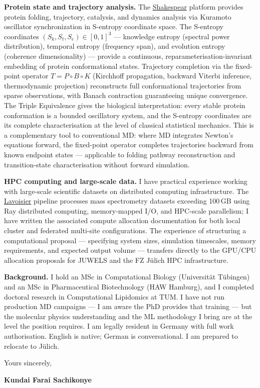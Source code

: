 \documentclass[12pt,a4paper]{article}
\begin{document}
\textbf{Protein state and trajectory analysis.}
The \href{https://shakespear-nine.vercel.app/instrument}{Shakespear} platform
provides protein folding, trajectory, catalysis, and dynamics analysis via
Kuramoto oscillator synchronization in S-entropy coordinate space.
The S-entropy coordinates $(S_k, S_t, S_e) \in [0,1]^3$ --- knowledge entropy
(spectral power distribution), temporal entropy (frequency span), and evolution
entropy (coherence dimensionality) --- provide a continuous, reparameterisation-invariant
embedding of protein conformational states.
Trajectory completion via the fixed-point operator $T = P \circ B \circ K$
(Kirchhoff propagation, backward Viterbi inference, thermodynamic projection)
reconstructs full conformational trajectories from sparse observations, with Banach
contraction guaranteeing unique convergence.
The Triple Equivalence gives the biological interpretation: every stable protein
conformation is a bounded oscillatory system, and the S-entropy coordinates are
its complete characterisation at the level of classical statistical mechanics.
This is a complementary tool to conventional MD: where MD integrates Newton's
equations forward, the fixed-point operator completes trajectories backward from
known endpoint states --- applicable to folding pathway reconstruction and
transition-state characterisation without forward simulation.

\textbf{HPC computing and large-scale data.}
I have practical experience working with large-scale scientific datasets on
distributed computing infrastructure. The \href{https://github.com/fullscreen-triangle/lavoisier}{Lavoisier}
pipeline processes mass spectrometry datasets exceeding 100\,GB using Ray
distributed computing, memory-mapped I/O, and HPC-scale parallelism; I have
written the associated compute allocation documentation for both local cluster
and federated multi-site configurations. The experience of structuring a
computational proposal --- specifying system sizes, simulation timescales, memory
requirements, and expected output volume --- transfers directly to the GPU/CPU
allocation proposals for JUWELS and the FZ Jülich HPC infrastructure.

\textbf{Background.}
I hold an MSc in Computational Biology (Universität Tübingen) and an MSc in
Pharmaceutical Biotechnology (HAW Hamburg), and I completed doctoral research
in Computational Lipidomics at TUM. I have not run production MD campaigns ---
I am aware the PhD provides that training --- but the molecular physics understanding
and the ML methodology I bring are at the level the position requires.
I am legally resident in Germany with full work authorisation.
English is native; German is conversational.
I am prepared to relocate to Jülich.

\vspace{1.5em}
Yours sincerely,

\vspace{2.5em}
\textbf{Kundai Farai Sachikonye}
\end{document}

